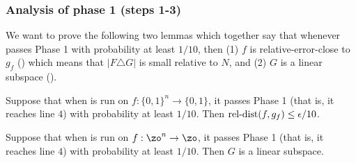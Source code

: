 \documentclass[11pt]{article}
\theoremstyle{definition}
\begin{document}
\subsubsection{Analysis of phase 1 (steps 1-3)}

We want to prove the following two lemmas which together say that whenever  passes Phase 1 with probability at least $1/10$, then  (1) $f$ is  relative-error-close to $g_f$ () which means that $|F \triangle G |$ is small relative to $N$, and (2) $G $ is a linear subspace ().



\begin{lemma}\label{lem:f is close to g conj}
Suppose that when  is run on $f:\{0,1\}^n\rightarrow \{0,1\}$, it passes Phase 1 (that is, it reaches  line $4$) with probability at least $1/10$. Then $\mathrm{rel}\text{-}\mathrm{dist}(f,g_f) \leq \epsilon/10$.
\end{lemma}


\begin{lemma}\label{lem:g is affine}
Suppose that when  is run on $f:\zo^n \to \zo$, it passes Phase 1 (that is, it reaches line ${4}$) with probability at least $1/10$.
 Then $G $ is a linear subspace.
\end{lemma}
\end{document}

